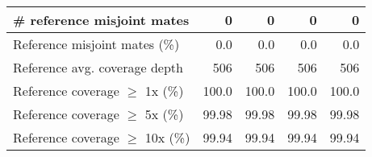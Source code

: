 \documentclass[12pt,a4paper]{article}
\begin{document}
\begin{table}[ht]
\begin{center}
\begin{tabular}{|l*{4}{|r}|}
\# reference misjoint mates & 0 & 0 & 0 & 0 \\ \hline
Reference misjoint mates (\%) & 0.0 & 0.0 & 0.0 & 0.0 \\ \hline
Reference avg. coverage depth & 506 & 506 & 506 & 506 \\ \hline
Reference coverage $\geq$ 1x (\%) & 100.0 & 100.0 & 100.0 & 100.0 \\ \hline
Reference coverage $\geq$ 5x (\%) & 99.98 & 99.98 & 99.98 & 99.98 \\ \hline
Reference coverage $\geq$ 10x (\%) & 99.94 & 99.94 & 99.94 & 99.94 \\ \hline
\end{tabular}
\end{center}
\end{table}
\end{document}
